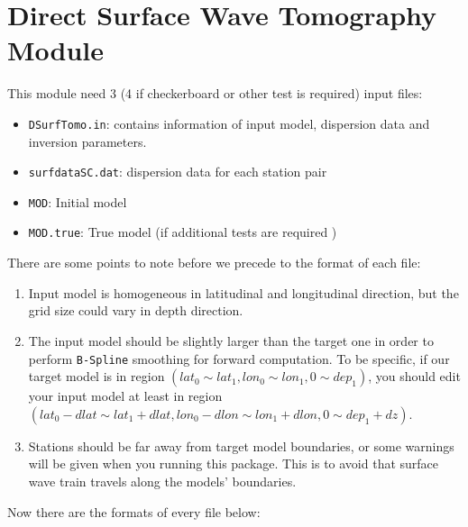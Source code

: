 \documentclass[UTF8]{article}
\begin{document}
\section{Direct Surface Wave Tomography Module} 
This module need 3 (4 if checkerboard or other test 
is required) input files:
\begin{itemize}
\item \verb!DSurfTomo.in!: contains information of 
        input model, dispersion data and inversion 
        parameters.
\item \verb!surfdataSC.dat!: dispersion data for 
            each station pair
\item \verb!MOD!: Initial model
\item \verb!MOD.true!: True model (if 
                        additional tests are required )
\end{itemize}
There are some points to note before we precede to the 
format of each file:
\begin{enumerate}[(1)]
    \item Input model is homogeneous in latitudinal and 
            longitudinal direction, but the grid size 
            could vary in depth direction.
    \item The input model should be slightly larger than
          the target one in order to perform \texttt{B-Spline}
          smoothing for forward computation. To be specific,
         if our target model is in region 
         $(lat_0 \sim lat_1,lon_0\sim lon_1,0\sim dep_1)$, 
        you should edit your input model at least in 
        region $(lat_0-dlat \sim lat_1+dlat, lon_0-dlon \sim lon_1+dlon,0 \sim dep_1+dz)$.
    \item Stations should be far away from target model 
            boundaries, or some warnings will be given 
            when you running this package. This is to 
            avoid that surface wave train travels along
            the models' boundaries.
\end{enumerate}
Now there are the formats of every file below:
\end{document}
